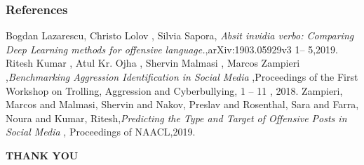 \documentclass{beamer}
\begin{document}
\begin{frame}\frametitle{References}
	\begin{thebibliography}{99}	
	 Bogdan Lazarescu, Christo Lolov , Silvia Sapora, {\em Absit invidia verbo: Comparing Deep Learning methods for offensive
	language.},arXiv:1903.05929v3 1-- 5,2019.
	Ritesh Kumar
	, Atul Kr. Ojha , Shervin Malmasi , Marcos Zampieri ,{\em Benchmarking Aggression Identification in Social Media} ,Proceedings of the First Workshop on Trolling, Aggression and Cyberbullying,  1 -- 11 , 2018.
	 Zampieri, Marcos and Malmasi, Shervin and Nakov, Preslav and Rosenthal, Sara and Farra, Noura and Kumar, Ritesh,{\em Predicting the Type and Target of Offensive Posts in Social Media} ,  Proceedings of NAACL,2019.
\end{thebibliography}
\end{frame}

\begin{frame}
    \begin{LARGE}
    \begin{Huge}
    \begin{center}
        \textbf{THANK YOU}
    \end{center}  
    \end{Huge}  
    \end{LARGE}
  
  
\end{frame}
\end{document}
